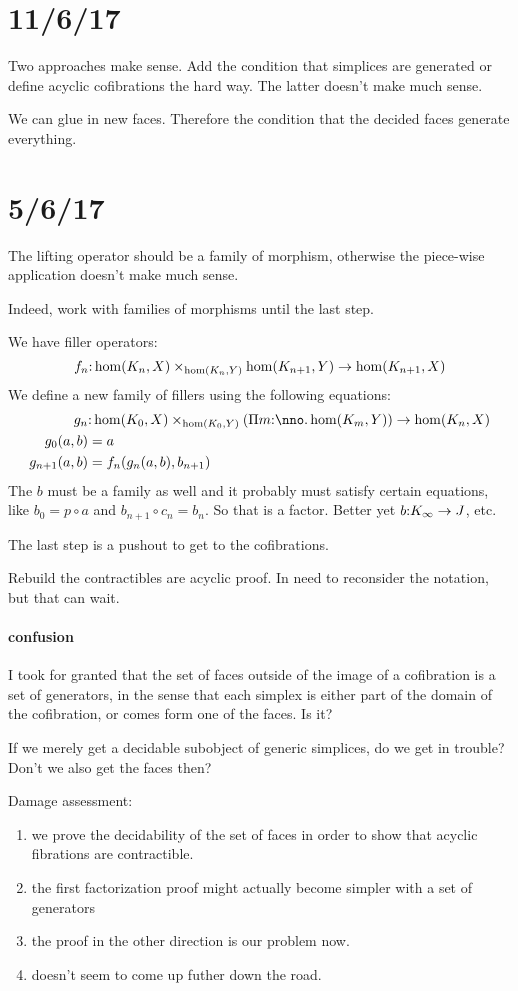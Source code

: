 \documentclass[csh.tex]{subfiles}
\begin{document}
\section{11/6/17}
Two approaches make sense. Add the condition that simplices are
generated or define acyclic cofibrations the hard way.
The latter doesn't make much sense.

We can glue in new faces. Therefore the condition that the decided
faces generate everything.

\section{5/6/17}
The lifting operator should be a family of morphism, otherwise
the piece-wise application doesn't make much sense.

Indeed, work with families of morphisms until the last step.

We have filler operators:
\[ f_n\mathord : \hom(K_n,X)\times_{\hom(K_n,Y)}\hom(K_{n+1},Y) \to \hom(K_{n+1},X) \]
We define a new family of fillers using the following equations:
\begin{align*}
g_n &\of \hom(K_0,X)\times_{\hom(K_0,Y)}(\product{m\of\nno}\hom(K_m,Y))\to \hom(K_n,X)\\
g_0(a,b) &= a\\
g_{n+1}(a,b) &= f_n(g_n(a,b),b_{n+1})
\end{align*}
The $b$ must be a family as well and it probably must satisfy certain equations, like $b_0 = p\circ a$ and $b_{n+1}\circ c_n = b_n$.
So that is a factor.
Better yet $b\mathord : K_\infty \to J$, etc.

The last step is a pushout to get to the cofibrations.

Rebuild the contractibles are acyclic proof. In need to reconsider the notation, but that can wait.

\paragraph{confusion}
I took for granted that the set of faces outside of the image of a cofibration is a set of generators, in the sense that each simplex is either part of the domain of the cofibration, or comes form one of the faces. Is it?

If we merely get a decidable subobject of generic simplices, do we get in trouble? Don't we also get the faces then?

Damage assessment:
\begin{enumerate}
\item we prove the decidability of the set of faces in order to show that acyclic fibrations are contractible.
\item the first factorization proof might actually become simpler
with a set of generators
\item the proof in the other direction is our problem now.
\item doesn't seem to come up futher down the road.
\end{enumerate}
\end{document}
